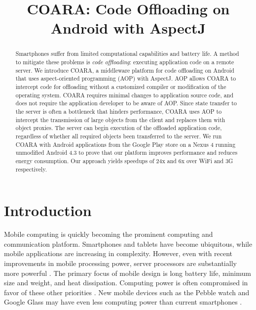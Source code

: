 \documentclass[10pt,journal,cspaper,compsoc]{IEEEtran}
\begin{document}
\title{COARA: Code Offloading on Android with AspectJ}

\author{
}


\maketitle
\begin{abstract}


Smartphones suffer from limited computational capabilities and battery life. A method to mitigate these problems is \emph{code offloading}: executing application code on a remote server. We introduce COARA, a middleware platform for code offloading on Android that uses aspect-oriented programming (AOP) with AspectJ.  AOP allows COARA to intercept code for offloading without a customized compiler or modification of the operating system. COARA requires minimal changes to application source code, and does not require the application developer to be aware of AOP.  Since state transfer to the server is often a bottleneck that hinders performance, COARA uses AOP to intercept the transmission of large objects from the client and replaces them with object proxies. The server can begin execution of the offloaded application code, regardless of whether all required objects been transferred to the server. We run COARA with Android applications from the Google Play store on a Nexus 4 running unmodified Android 4.3 to prove that our platform improves performance and reduces energy consumption. Our approach yields speedups of 24x and 6x over WiFi and 3G respectively.

\end{abstract}



\section{Introduction}


Mobile computing is quickly becoming the prominent computing and communication platform. Smartphones and tablets have become ubiquitous, while mobile applications are increasing in complexity. However, even with recent improvements in mobile processing power, server processors are substantially more powerful \cite{Flinn:2012ws}.  The primary focus of mobile design is long battery life, minimum size and weight, and heat dissipation.  Computing power is often compromised in favor of these other priorities \cite{Ha_JustInTime:2012wx}.  New mobile devices such as the Pebble watch and Google Glass may have even less computing power than current smartphones \cite{Fahim:2013dd}.
\end{document}
